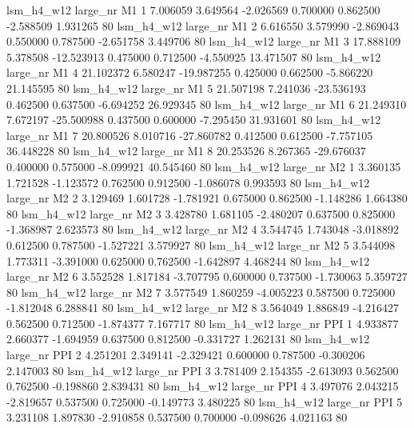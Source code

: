   lsm_h4_w12   large_nr       M1                 1  7.006059  3.649564  -2.026569 0.700000 0.862500 -2.588509    1.931265 80
  lsm_h4_w12   large_nr       M1                 2  6.616550  3.579990  -2.869043 0.550000 0.787500 -2.651758    3.449706 80
  lsm_h4_w12   large_nr       M1                 3 17.888109  5.378508 -12.523913 0.475000 0.712500 -4.550925   13.471507 80
  lsm_h4_w12   large_nr       M1                 4 21.102372  6.580247 -19.987255 0.425000 0.662500 -5.866220   21.145595 80
  lsm_h4_w12   large_nr       M1                 5 21.507198  7.241036 -23.536193 0.462500 0.637500 -6.694252   26.929345 80
  lsm_h4_w12   large_nr       M1                 6 21.249310  7.672197 -25.500988 0.437500 0.600000 -7.295450   31.931601 80
  lsm_h4_w12   large_nr       M1                 7 20.800526  8.010716 -27.860782 0.412500 0.612500 -7.757105   36.448228 80
  lsm_h4_w12   large_nr       M1                 8 20.253526  8.267365 -29.676037 0.400000 0.575000 -8.099921   40.545460 80
  lsm_h4_w12   large_nr       M2                 1  3.360135  1.721528  -1.123572 0.762500 0.912500 -1.086078    0.993593 80
  lsm_h4_w12   large_nr       M2                 2  3.129469  1.601728  -1.781921 0.675000 0.862500 -1.148286    1.664380 80
  lsm_h4_w12   large_nr       M2                 3  3.428780  1.681105  -2.480207 0.637500 0.825000 -1.368987    2.623573 80
  lsm_h4_w12   large_nr       M2                 4  3.544745  1.743048  -3.018892 0.612500 0.787500 -1.527221    3.579927 80
  lsm_h4_w12   large_nr       M2                 5  3.544098  1.773311  -3.391000 0.625000 0.762500 -1.642897    4.468244 80
  lsm_h4_w12   large_nr       M2                 6  3.552528  1.817184  -3.707795 0.600000 0.737500 -1.730063    5.359727 80
  lsm_h4_w12   large_nr       M2                 7  3.577549  1.860259  -4.005223 0.587500 0.725000 -1.812048    6.288841 80
  lsm_h4_w12   large_nr       M2                 8  3.564049  1.886849  -4.216427 0.562500 0.712500 -1.874377    7.167717 80
  lsm_h4_w12   large_nr      PPI                 1  4.933877  2.660377  -1.694959 0.637500 0.812500 -0.331727    1.262131 80
  lsm_h4_w12   large_nr      PPI                 2  4.251201  2.349141  -2.329421 0.600000 0.787500 -0.300206    2.147003 80
  lsm_h4_w12   large_nr      PPI                 3  3.781409  2.154355  -2.613093 0.562500 0.762500 -0.198860    2.839431 80
  lsm_h4_w12   large_nr      PPI                 4  3.497076  2.043215  -2.819657 0.537500 0.725000 -0.149773    3.480225 80
  lsm_h4_w12   large_nr      PPI                 5  3.231108  1.897830  -2.910858 0.537500 0.700000 -0.098626    4.021163 80
